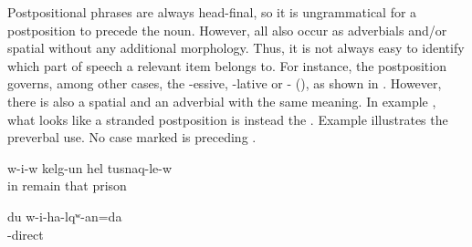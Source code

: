 Postpositional phrases are always head-final, so it is ungrammatical for a postposition to precede the noun. However, all  also occur as adverbials and/or spatial  without any additional morphology. Thus, it is not always easy to identify which part of speech a relevant item belongs to. For instance, the postposition   governs, among other cases, the -essive, -lative or - (), as shown in . However, there is also a spatial   and an adverbial  with the same meaning. In example , what looks like a stranded postposition  is instead the . Example  illustrates the preverbal use. No case marked  is preceding .
%
\begin{exe}
	\ex	\label{ex:He stayed in prison}
	\gll	w-i-w kelg-un	hel	tusnaq-le-w\\
		in remain	that	prison\\
	\glt	{}

	\ex	\label{ex:I will go inside}
	\gll	du	w-i-ha-lqʷ-an=da\\
			-direct\\
	\glt	{}
\end{exe}
